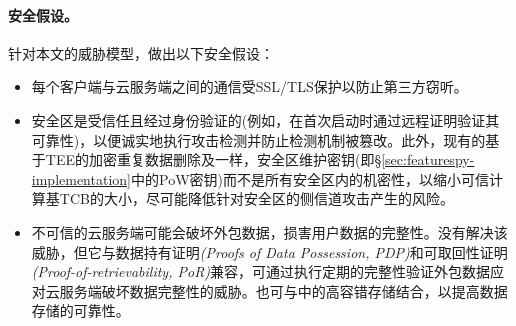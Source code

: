 \paragraph*{安全假设。}针对本文的威胁模型，做出以下安全假设：
\begin{itemize}[leftmargin=0em]
    \item 每个客户端与云服务端之间的通信受SSL/TLS保护以防止第三方窃听。
    \item 安全区是受信任且经过身份验证的(例如，在首次启动时通过远程证明验证其可靠性)，以便诚实地执行攻击检测并防止检测机制被篡改。此外，现有的基于TEE的加密重复数据删除及\sysnameS 一样，安全区维护密钥(即\S\ref{sec:featurespy-implementation}中的PoW密钥)而不是所有安全区内的机密性，以缩小可信计算基TCB的大小，尽可能降低针对安全区的侧信道攻击产生的风险。
    \item 不可信的云服务端可能会破坏外包数据，损害用户数据的完整性。\sysnameF 没有解决该威胁，但它与数据持有证明\textit{(Proofs of Data Possession, PDP)}和可取回性证明\textit{(Proof-of-retrievability, PoR)}兼容，可通过执行定期的完整性验证外包数据应对云服务端破坏数据完整性的威胁。\sysnameF 也可与中的高容错存储结合，以提高数据存储的可靠性。
\end{itemize}
